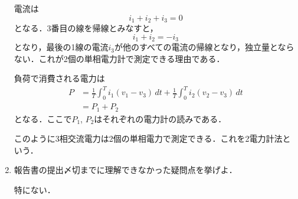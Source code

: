 \begin{enumerate}[1.)]
	電流は
	\begin{equation}
		i_{1}+i_{2}+i_{3}=0
	\end{equation}
	となる．3番目の線を帰線とみなすと，
	\begin{equation}
		i_{1}+i_{2}=-i_{3}
	\end{equation}
	となり，最後の1線の電流$i_{3}$が他のすべての電流の帰線となり，独立量とならない．これが2個の単相電力計で測定できる理由である．
	
	負荷で消費される電力は
	\begin{align}
		P&=\frac{1}{T}\int_{0}^{T} i_{1}(v_{1}-v_{3})\,dt+\frac{1}{T}\int_{0}^{T}i_{2}(v_{2}-v_{3})\,dt\\
		&=P_{1}+P_{2}
	\end{align}
	となる．ここで$P_{1}$, $P_{2}$はそれぞれの電力計の読みである．
	
	このように3相交流電力は2個の単相電力で測定できる．これを2電力計法という．
	\item 報告書の提出〆切までに理解できなかった疑問点を挙げよ．
	
	特にない．
\end{enumerate}